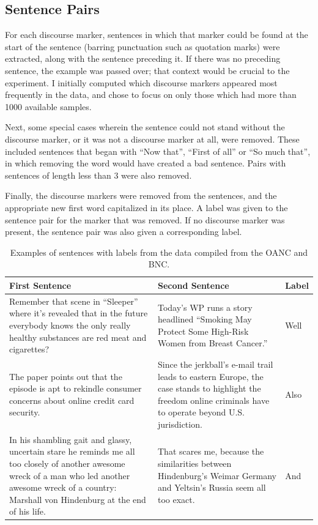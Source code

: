 \subsection{Sentence Pairs}

For each discourse marker, sentences in which that marker could be found at the start of the sentence (barring punctuation such as quotation marks) were extracted, along with the sentence preceding it. If there was no preceding sentence, the example was passed over; that context would be crucial to the experiment. I initially computed which discourse markers appeared most frequently in the data, and chose to focus on only those which had more than 1000 available samples.

Next, some special cases wherein the sentence could not stand without the discourse marker, or it was not a discourse marker at all, were removed. These included sentences that began with ``Now that'', ``First of all'' or ``So much that'', in which removing the word would have created a bad sentence. Pairs with sentences of length less than 3 were also removed.

Finally, the discourse markers were removed from the sentences, and the appropriate new first word capitalized in its place. A label was given to the sentence pair for the marker that was removed. If no discourse marker was present, the sentence pair was also given a corresponding label.

\begin{table}[h]
\centering
 \begin{tabular}{|| p{5.5cm} | p{5.5cm} | p{1cm} ||} 
 \hline
 First Sentence & Second Sentence & Label \\ [0.3ex] 
 \hline\hline
 Remember that scene in ``Sleeper'' where it's revealed that in the future everybody knows the only really healthy substances are red meat and cigarettes? & 
    Today's WP runs a story headlined ``Smoking May Protect Some High-Risk Women from Breast Cancer.'' &
    Well \\
\hline
 The paper points out that the episode is apt to rekindle consumer concerns about online credit card security. & 
    Since the jerkball's e-mail trail leads to eastern Europe, the case stands to highlight the freedom online criminals have to operate beyond U.S. jurisdiction. &
    Also \\
\hline
 In his shambling gait and glassy, uncertain stare he reminds me all too closely of another awesome wreck of a man who led another awesome wreck of a country: Marshall von Hindenburg at the end of his life. & 
    That scares me, because the similarities between Hindenburg's Weimar Germany and Yeltsin's Russia seem all too exact. &
    And \\
\hline
\end{tabular}
\caption{Examples of sentences with labels from the data compiled from the OANC and BNC.}
\label{disc-mark-data-examples}
\end{table}

